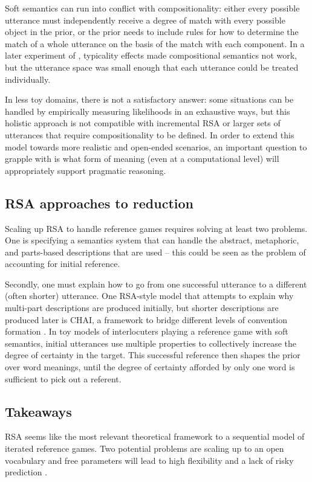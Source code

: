\documentclass[]{article}
\begin{document}
Soft semantics can run into conflict with compositionality: either every possible utterance must independently receive a degree of match with every possible object in the prior, or the prior needs to include rules for how to determine the match of a whole utterance on the basis of the match with each component. In a later experiment of \citep{degen20200406}, typicality effects made compositional semantics not work, but the utterance space was small enough that each utterance could be treated individually. 

 In less toy domains, there is not a satisfactory answer: some situations can be handled by empirically measuring likelihoods in an exhaustive ways, but this holistic approach is not compatible with incremental RSA \citep{TODO} or larger sets of utterances that require compositionality to be defined. In order to extend this model towards more realistic and open-ended scenarios, an important question to grapple with is what form of meaning (even at a computational level) will appropriately support pragmatic reasoning. 

\subsection{RSA approaches to reduction}
Scaling up RSA to handle reference games requires solving at least two problems. One is specifying a semantics system that can handle the abstract, metaphoric, and parts-based descriptions that are used -- this could be seen as the problem of accounting for initial reference. 

Secondly, one must explain how to go from one successful utterance to a different (often shorter) utterance. One RSA-style model that attempts to explain why multi-part descriptions are produced initially, but shorter descriptions are produced later is CHAI,  a framework to bridge different levels of convention formation \citep{hawkins2021}. %
In toy models of interlocuters playing a reference game with soft semantics, initial utterances use multiple properties to collectively increase the degree of certainty in the target. This successful reference then shapes the prior over word meanings, until the degree of certainty afforded by only one word is sufficient to pick out a referent. 


\subsection{Takeaways}
RSA seems like the most relevant theoretical framework to a sequential model of iterated reference games. Two potential problems are scaling up to an open vocabulary and free parameters will lead to high flexibility and a lack of risky prediction \citep{TODO}.
\end{document}
